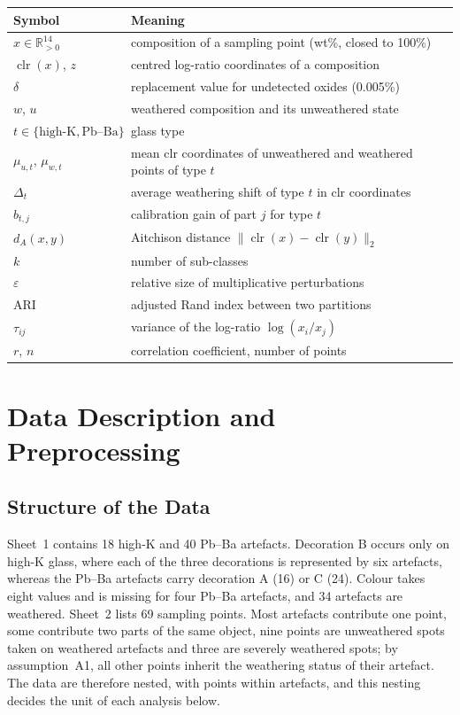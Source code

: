 \documentclass[11pt,a4paper]{article}
\newcommand{\clr}{\operatorname{clr}}
\begin{document}
\begin{center}
\small
\begin{tabular}{ll}
\toprule
Symbol & Meaning \\
\midrule
$x\in\mathbb{R}^{14}_{>0}$ & composition of a sampling point (wt\%, closed to 100\%) \\
$\clr(x)$, $z$ & centred log-ratio coordinates of a composition \\
$\delta$ & replacement value for undetected oxides (0.005\%) \\
$w$, $u$ & weathered composition and its unweathered state \\
$t\in\{\text{high-K},\text{Pb--Ba}\}$ & glass type \\
$\mu_{u,t}$, $\mu_{w,t}$ & mean clr coordinates of unweathered and weathered points of type $t$ \\
$\Delta_t$ & average weathering shift of type $t$ in clr coordinates \\
$b_{t,j}$ & calibration gain of part $j$ for type $t$ \\
$d_A(x,y)$ & Aitchison distance $\lVert\clr(x)-\clr(y)\rVert_2$ \\
$k$ & number of sub-classes \\
$\varepsilon$ & relative size of multiplicative perturbations \\
ARI & adjusted Rand index between two partitions \\
$\tau_{ij}$ & variance of the log-ratio $\log(x_i/x_j)$ \\
$r$, $n$ & correlation coefficient, number of points \\
\bottomrule
\end{tabular}
\end{center}

\section{Data Description and Preprocessing}\label{sec:data}

\subsection{Structure of the Data}
Sheet~1 contains 18 high-K and 40 Pb--Ba artefacts.
Decoration B occurs only on high-K glass, where each of the three decorations is represented by six artefacts, whereas the Pb--Ba artefacts carry decoration A (16) or C (24).
Colour takes eight values and is missing for four Pb--Ba artefacts, and 34 artefacts are weathered.
Sheet~2 lists 69 sampling points.
Most artefacts contribute one point, some contribute two parts of the same object, nine points are unweathered spots taken on weathered artefacts and three are severely weathered spots; by assumption~A1, all other points inherit the weathering status of their artefact.
The data are therefore nested, with points within artefacts, and this nesting decides the unit of each analysis below.
\end{document}
